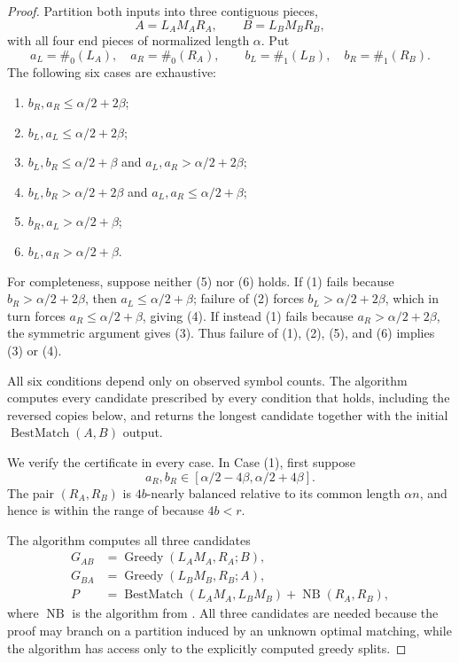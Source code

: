 \documentclass[11pt]{article}
\theoremstyle{remark}
\newcommand{\BestMatch}{\operatorname{BestMatch}}
\newcommand{\Greedy}{\operatorname{Greedy}}
\begin{document}
\begin{proof}
Partition both inputs into three contiguous pieces,
\[
 A=L_AM_AR_A,\qquad B=L_BM_BR_B,
\]
with all four end pieces of normalized length $\alpha$.  Put
\[
 a_L=\#_0(L_A),\quad a_R=\#_0(R_A),\qquad
 b_L=\#_1(L_B),\quad b_R=\#_1(R_B).
\]
The following six cases are exhaustive:
\begin{enumerate}[label=\textup{(\arabic*)},leftmargin=2.4em]
\item $b_R,a_R\le\alpha/2+2\beta$;
\item $b_L,a_L\le\alpha/2+2\beta$;
\item $b_L,b_R\le\alpha/2+\beta$ and
      $a_L,a_R>\alpha/2+2\beta$;
\item $b_L,b_R>\alpha/2+2\beta$ and
      $a_L,a_R\le\alpha/2+\beta$;
\item $b_R,a_L>\alpha/2+\beta$;
\item $b_L,a_R>\alpha/2+\beta$.
\end{enumerate}
For completeness, suppose neither (5) nor (6) holds.  If (1) fails
because $b_R>\alpha/2+2\beta$, then $a_L\le\alpha/2+\beta$;
failure of (2) forces $b_L>\alpha/2+2\beta$, which in turn forces
$a_R\le\alpha/2+\beta$, giving (4).  If instead (1) fails because
$a_R>\alpha/2+2\beta$, the symmetric argument gives (3).
Thus failure of (1), (2), (5), and (6) implies (3) or (4).

All six conditions depend only on observed symbol counts.  The
algorithm computes every candidate prescribed by every condition that
holds, including the reversed copies below, and returns the longest
candidate together with the initial $\BestMatch(A,B)$ output.

We verify the certificate in every case.  In Case (1), first suppose
\begin{equation}\label{eq:case-1a}
 a_R,b_R\in[\alpha/2-4\beta,\alpha/2+4\beta].
\end{equation}
The pair $(R_A,R_B)$ is $4b$-nearly balanced relative to its common
length $\alpha n$, and hence is within the range of
 because $4b<r$.

The algorithm computes all three candidates
\begin{align}
 G_{AB}&=\Greedy(L_AM_A,R_A;B),\nonumber\\
 G_{BA}&=\Greedy(L_BM_B,R_B;A),\label{eq:three-candidates}\\
 P&=\BestMatch(L_AM_A,L_BM_B)
       +\operatorname{NB}(R_A,R_B),\nonumber
\end{align}
where $\operatorname{NB}$ is the algorithm from
.  All three candidates are needed because
the proof may branch on a partition induced by an unknown optimal
matching, while the algorithm has access only to the explicitly
computed greedy splits.


\end{proof}
\end{document}
